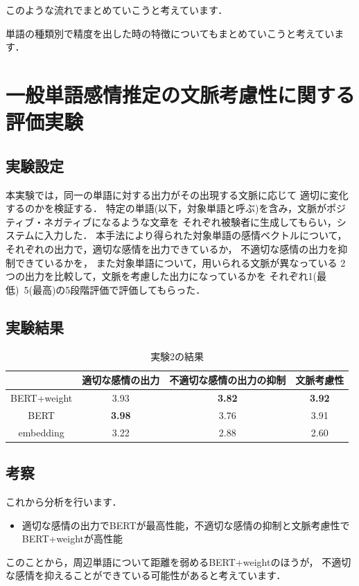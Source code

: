 		このような流れでまとめていこうと考えています．
		


		単語の種類別で精度を出した時の特徴についてもまとめていこうと考えています．

					

\section{一般単語感情推定の文脈考慮性に関する評価実験}
	\subsection{実験設定}
		本実験では，同一の単語に対する出力がその出現する文脈に応じて
		適切に変化するのかを検証する．
		特定の単語(以下，対象単語と呼ぶ)を含み，文脈がポジティブ・ネガティブになるような文章を
		それぞれ被験者に生成してもらい，システムに入力した．
		本手法により得られた対象単語の感情ベクトルについて，
		それぞれの出力で，適切な感情を出力できているか，
		不適切な感情の出力を抑制できているかを，
		また対象単語について，用いられる文脈が異なっている
		2つの出力を比較して，文脈を考慮した出力になっているかを
		それぞれ1(最低)~5(最高)の5段階評価で評価してもらった．


	\subsection{実験結果}
	\begin{table}[H]
		\centering
		\caption{実験2の結果}
		\label{normal_word_result}
			\begin{tabular}{cccc}
				\hline
				& 適切な感情の出力 & 不適切な感情の出力の抑制 & 文脈考慮性 \\
				\hline \hline
				BERT+weight & 3.93 & \textbf{3.82} & \textbf{3.92} \\
				BERT & \textbf{3.98} & 3.76 & 3.91 \\
				embedding & 3.22 & 2.88 & 2.60 \\
				\hline
			\end{tabular}
		\end{table}
	\subsection{考察}
	これから分析を行います．
	\begin{itemize}
		\item 適切な感情の出力でBERTが最高性能，不適切な感情の抑制と文脈考慮性でBERT+weightが高性能
	\end{itemize}
	このことから，周辺単語について距離を弱めるBERT+weightのほうが，
	不適切な感情を抑えることができている可能性があると考えています．

